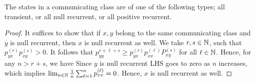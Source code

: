 \documentclass[letterpaper,10pt,english]{article}
\begin{document}
\begin{thm} 
The states in a communicating class are of one of the following types; all transient, or all null recurrent, or all positive recurrent. 
\end{thm}
\begin{proof} 
It suffices to show that if $x,y$ belong to the same communicating class and $y$ is null recurrent, then $x$ is null recurrent as well. 
We take $r,s \in \mathbb{N}$, such that $p_{yx}^{(r)}p_{xy}^{(s)} > 0$. 
It follows that $p_{yy}^{r+\ell+s} \ge p_{yx}^{(r)}p_{xx}^{(\ell)}P_{xy}^{(s)}$ for all $\ell \in \mathbb{N}$. 
Hence, for any $n > r + s$, we have 
Since $y$ is null recurrent LHS goes to zero as $n$ increases, which implies $\lim_{n \in \mathbb{N}}\frac{1}{n}\sum_{\ell = 1}^{n}p_{xx}^{(\ell)} = 0$. 
Hence, $x$ is null recurrent as well. 
\end{proof}
\end{document}
